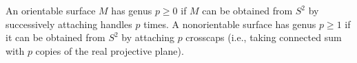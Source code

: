 An orientable surface $M$ has genus $p \geqslant 0$ if $M$ can be obtained from $S^2$ by successively attaching handles $p$ times. A nonorientable surface has genus $p \geqslant 1$ if it can be obtained from $S^2$ by attaching $p$ crosscaps (i.e., taking connected sum with $p$ copies of the real projective plane).
